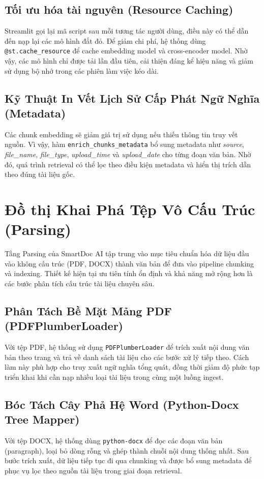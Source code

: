 \documentclass[10pt, conference, a4paper, compsocconf]{IEEEtran}
\begin{document}
\subsection{Tối ưu hóa tài nguyên (Resource Caching)}
Streamlit gọi lại mã script sau mỗi tương tác người dùng, điều này có thể dẫn đến nạp lại các mô hình đắt đỏ. Để giảm chi phí, hệ thống dùng \texttt{@st.cache\_resource} để cache embedding model và cross-encoder model. Nhờ vậy, các mô hình chỉ được tải lần đầu tiên, cải thiện đáng kể hiệu năng và giảm sử dụng bộ nhớ trong các phiên làm việc kéo dài.

\subsection{Kỹ Thuật In Vết Lịch Sử Cấp Phát Ngữ Nghĩa (Metadata)}
Các chunk embedding sẽ giảm giá trị sử dụng nếu thiếu thông tin truy vết nguồn. Vì vậy, hàm \texttt{enrich\_chunks\_metadata} bổ sung metadata như \textit{source}, \textit{file\_name}, \textit{file\_type}, \textit{upload\_time} và \textit{upload\_date} cho từng đoạn văn bản. Nhờ đó, quá trình retrieval có thể lọc theo điều kiện metadata và hiển thị trích dẫn theo đúng tài liệu gốc.

\section{Đồ thị Khai Phá Tệp Vô Cấu Trúc (Parsing)}

Tầng Parsing của SmartDoc AI tập trung vào mục tiêu chuẩn hóa dữ liệu đầu vào không cấu trúc (PDF, DOCX) thành văn bản để đưa vào pipeline chunking và indexing. Thiết kế hiện tại ưu tiên tính ổn định và khả năng mở rộng hơn là các bước phân tích cấu trúc tài liệu chuyên sâu.

\subsection{Phân Tách Bề Mặt Mảng PDF (PDFPlumberLoader)}
Với tệp PDF, hệ thống sử dụng \texttt{PDFPlumberLoader} để trích xuất nội dung văn bản theo trang và trả về danh sách tài liệu cho các bước xử lý tiếp theo. Cách làm này phù hợp cho truy xuất ngữ nghĩa tổng quát, đồng thời giảm độ phức tạp triển khai khi cần nạp nhiều loại tài liệu trong cùng một luồng ingest.

\subsection{Bóc Tách Cây Phả Hệ Word (Python-Docx Tree Mapper)}
Với tệp DOCX, hệ thống dùng \texttt{python-docx} để đọc các đoạn văn bản (paragraph), loại bỏ dòng rỗng và ghép thành chuỗi nội dung thống nhất. Sau bước trích xuất, dữ liệu tiếp tục đi qua chunking và được bổ sung metadata để phục vụ lọc theo nguồn tài liệu trong giai đoạn retrieval.
\end{document}
